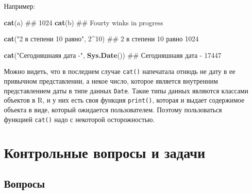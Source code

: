 \documentclass[]{book}
\newenvironment{Shaded}{\begin{snugshade}}{\end{snugshade}}
\newcommand{\KeywordTok}[1]{\textcolor[rgb]{0.13,0.29,0.53}{\textbf{#1}}}
\newcommand{\DecValTok}[1]{\textcolor[rgb]{0.00,0.00,0.81}{#1}}
\newcommand{\StringTok}[1]{\textcolor[rgb]{0.31,0.60,0.02}{#1}}
\newcommand{\OperatorTok}[1]{\textcolor[rgb]{0.81,0.36,0.00}{\textbf{#1}}}
\newcommand{\NormalTok}[1]{#1}
\begin{document}
Например:

\begin{Shaded}
\begin{Highlighting}[]
\KeywordTok{cat}\NormalTok{(a)}
\NormalTok{## 1024}
\KeywordTok{cat}\NormalTok{(b)}
\NormalTok{## Fourty winks in progress}

\KeywordTok{cat}\NormalTok{(}\StringTok{"2 в степени 10 равно"}\NormalTok{, }\DecValTok{2}\OperatorTok{^}\DecValTok{10}\NormalTok{)}
\NormalTok{## 2 в степени 10 равно 1024}

\KeywordTok{cat}\NormalTok{(}\StringTok{"Сегодняшнаяя дата -"}\NormalTok{, }\KeywordTok{Sys.Date}\NormalTok{())}
\NormalTok{## Сегодняшнаяя дата - 17447}
\end{Highlighting}
\end{Shaded}

Можно видеть, что в последнем случае \texttt{cat()} напечатала отнюдь не
дату в ее привычном представлении, а некое число, которое является
внутренним представлением даты в типе данных \texttt{Date}. Такие типы
данных являются классами объектов в R, и у них есть своя функция
\texttt{print()}, которая и выдает содержимое объекта в виде, который
ожидается пользователем. Поэтому пользоваться функцией \texttt{cat()}
надо с некоторой осторожностью.

\section{Контрольные вопросы и задачи}\label{questions_tasks_basics}

\subsection{Вопросы}\label{questions_basics}
\end{document}
